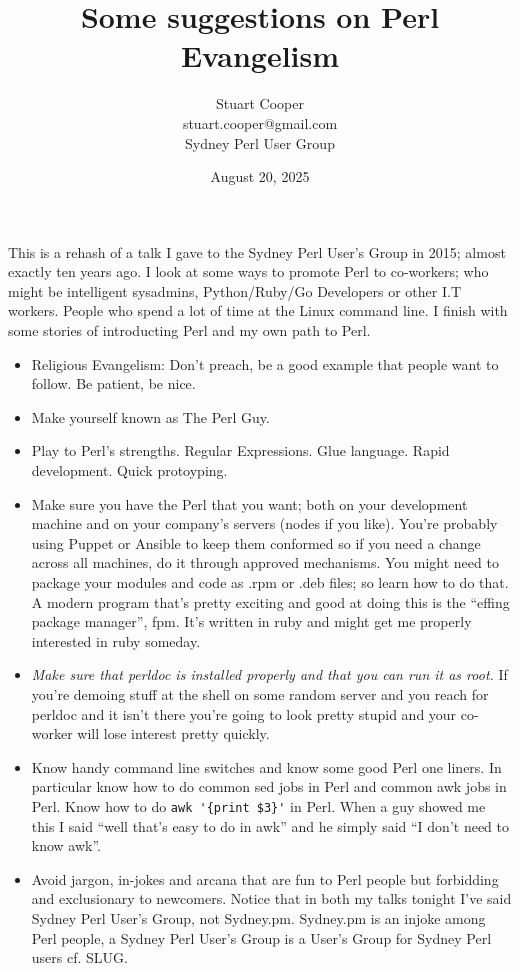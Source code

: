 \documentclass{article}
\title{Some suggestions on Perl Evangelism}
\author{Stuart Cooper\\stuart.cooper@gmail.com\\Sydney Perl User Group}
\date{August 20, 2025}
\begin{document}
\maketitle

This is a rehash of a talk I gave to the Sydney Perl User's Group in
2015; almost exactly ten years ago. I look at some ways to
promote Perl to co-workers; who might be intelligent sysadmins,
Python/Ruby/Go Developers or other I.T workers. People
who spend a lot of time at the Linux command line. I finish with some
stories of introducting Perl and my own path to Perl.

\begin{itemize}
  \item Religious Evangelism: Don't preach, be a good example that
    people want to follow. Be patient, be nice.
  \item Make yourself known as The Perl Guy.
  \item Play to Perl's strengths. Regular Expressions. Glue
    language. Rapid development. Quick protoyping.
  \item Make sure you have the Perl that you want; both on your
    development machine and on your company's servers (nodes if you
    like). You're probably using Puppet or Ansible to keep them
    conformed so if you need a change across all machines, do it
    through approved mechanisms. You might need to package your
    modules and code as .rpm or .deb files; so learn how to do that. A
    modern program that's pretty exciting and good at doing this is
    the ``effing package manager'', fpm. It's written in ruby and
    might get me properly interested in ruby someday.
  \item \emph{Make sure that \emph{perldoc} is installed properly and that
  you can run it as root.} If you're demoing stuff at the shell on some
    random server and you reach for perldoc and it isn't there you're
    going to look pretty stupid and your co-worker will lose interest
    pretty quickly.
  \item Know handy command line switches and know some good Perl one
    liners. In particular know how to do common sed jobs in Perl and
    common awk jobs in Perl. Know how to do \verb!awk '{print $3}'!
    in Perl. When a guy showed me this I said ``well that's easy to do
    in awk'' and he simply said ``I don't need to know awk''.
  \item Avoid jargon, in-jokes and arcana that are fun to Perl people
    but forbidding and exclusionary to newcomers. Notice that in both
    my talks tonight I've said Sydney Perl User's Group, not
    Sydney.pm. Sydney.pm is an injoke among Perl people, a Sydney Perl
    User's Group is a User's Group for Sydney Perl users cf. SLUG.
\end{itemize}
\end{document}
